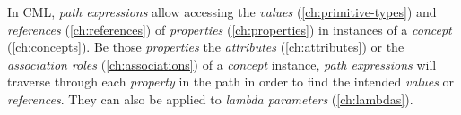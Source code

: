 In CML, \emph{path expressions} allow accessing
the \emph{values} (\ref{ch:primitive-types})
and \emph{references} (\ref{ch:references})
of \emph{properties} (\ref{ch:properties})
in instances of a \emph{concept} (\ref{ch:concepts}).
Be those \emph{properties}
the \emph{attributes} (\ref{ch:attributes})
or the \emph{association roles} (\ref{ch:associations})
of a \emph{concept} instance,
\emph{path expressions} will traverse through each \emph{property}
in the path in order to find the intended \emph{values} or \emph{references}.
They can also be applied to \emph{lambda parameters} (\ref{ch:lambdas}).
